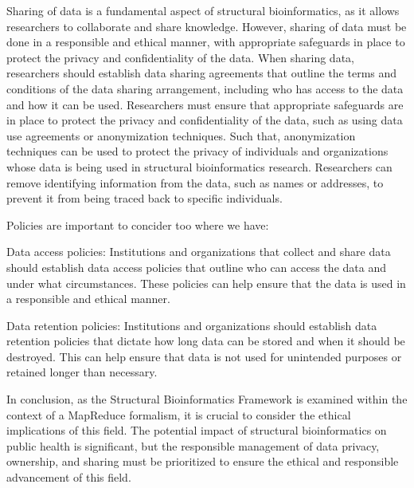 \documentclass[]{final_report}
\begin{document}
Sharing of data is a fundamental aspect of structural bioinformatics, as it allows researchers to collaborate and share knowledge. However, sharing of data must be done in a responsible and ethical manner, with appropriate safeguards in place to protect the privacy and confidentiality of the data. When sharing data, researchers should establish data sharing agreements that outline the terms and conditions of the data sharing arrangement, including who has access to the data and how it can be used. Researchers must ensure that appropriate safeguards are in place to protect the privacy and confidentiality of the data, such as using data use agreements or anonymization techniques. Such that, anonymization techniques can be used to protect the privacy of individuals and organizations whose data is being used in structural bioinformatics research. Researchers can remove identifying information from the data, such as names or addresses, to prevent it from being traced back to specific individuals.

Policies are important to concider too where we have:

Data access policies: Institutions and organizations that collect and share data should establish data access policies that outline who can access the data and under what circumstances. These policies can help ensure that the data is used in a responsible and ethical manner.

Data retention policies: Institutions and organizations should establish data retention policies that dictate how long data can be stored and when it should be destroyed. This can help ensure that data is not used for unintended purposes or retained longer than necessary.

In conclusion, as the Structural Bioinformatics Framework is examined within the context of a MapReduce formalism, it is crucial to consider the ethical implications of this field. The potential impact of structural bioinformatics on public health is significant, but the responsible management of data privacy, ownership, and sharing must be prioritized to ensure the ethical and responsible advancement of this field.





\end{document}

